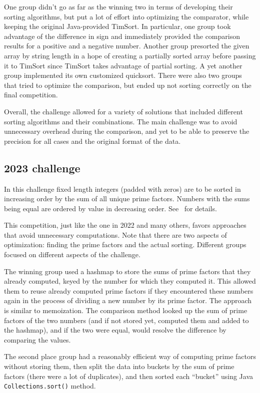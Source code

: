 \documentclass[12pt]{article}
\begin{document}
One group didn't go as far as the winning two in terms of developing their sorting algorithms, but put a lot of effort into optimizing the comparator, while keeping the original Java-provided TimSort. In particular, one group took advantage of the difference in sign and immediately provided the comparison results for a positive and a negative number. Another group presorted the given array by string length in a hope of creating a partially sorted array before passing it to TimSort since TimSort takes advantage of partial sorting. A yet another group implemented its own customized quicksort. 
There were also two groups that tried to optimize the comparison, but ended up not sorting correctly on the final competition. 

Overall, the challenge allowed for a variety of solutions that included different sorting algorithms and their combinations. The main challenge was to avoid unnecessary overhead during the comparison, and yet to be able to preserve the precision for all cases and the original format of the data. 

\subsection{2023 challenge}\label{subsec:2023}
In this challenge fixed length integers (padded with zeros) are to be sorted in increasing order by the sum of all unique prime factors. Numbers with the sums being equal are ordered by value in decreasing order. See~\cite{sorting2023} for details. 

This competition, just like the one in 2022 and many others, favors approaches that avoid unnecessary  computations. Note that there are two aspects of optimization: finding the prime factors and the actual sorting. Different groups focused on different aspects of the challenge. 

The winning group used a hashmap to store the sums of prime factors that they already computed, keyed by the number for which they computed it. This allowed them to reuse already computed prime factors if they encountered these numbers again in the process of dividing a new number by its prime factor. The approach is similar to memoization. The comparison method looked up the sum of prime factors of the two numbers (and if not stored yet, computed them and added to the hashmap), and if the two were equal, would resolve the difference by comparing the values.

The second place group had a reasonably efficient way of computing prime factors without storing them, then split the data into buckets by the sum of prime factors (there were a lot of duplicates), and then sorted each ``bucket'' using Java \texttt{Collections.sort()} method. 
\end{document}
